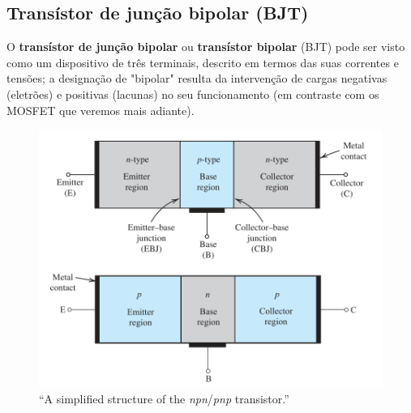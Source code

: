 \subsection[3.1 Transístor de junção bipolar (BJT)]{\hspace*{0.075 em}\raisebox{0.2 em}{$\pmb{\drsh}$} Transístor de junção bipolar (BJT)}
\label{subsec:transístor-BJT}

O \textbf{transístor de junção bipolar} ou \textbf{transístor bipolar} (BJT) pode ser visto como um dispositivo de três terminais, descrito em termos das suas correntes e tensões; a designação de "bipolar" resulta da intervenção de cargas negativas (eletrões) e positivas (lacunas) no seu funcionamento (em contraste com os MOSFET que veremos mais adiante).

\begin{figure}[H]
    \centering
    \includegraphics[width=0.7\linewidth]{img/3/BJT/npn-pnp-structure.png}
    \caption{``A simplified structure of the \textit{npn}/\textit{pnp} transistor.''\cite{sedra-smith:microelectronic-circuits}}
    \label{fig:npn-pnp-structure}
\end{figure}

